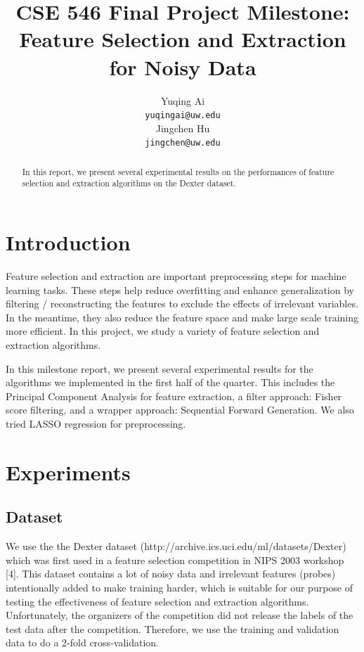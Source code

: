 \documentclass{article} %
\title{CSE 546 Final Project Milestone:\\
	Feature Selection and Extraction for Noisy Data}
\author{
	Yuqing Ai \\
	\texttt{yuqingai@uw.edu} \\
	\And
	Jingchen Hu \\
	\texttt{jingchen@uw.edu} \\
}
\begin{document}
	
	
	\maketitle
	
	\begin{abstract}
		In this report, we present several experimental results on the performances of feature selection and extraction algorithms on the Dexter dataset.
	\end{abstract}
	
	\section{Introduction}
	Feature selection and extraction are important preprocessing steps for machine learning tasks. These steps help reduce overfitting and enhance generalization by filtering / reconstructing the features to exclude the effects of irrelevant variables. In the meantime, they also reduce the feature space and make large scale training more efficient. In this project, we study a variety of feature selection and extraction algorithms.
	
	In this milestone report, we present several experimental results for the algorithms we implemented in the first half of the quarter. This includes the Principal Component Analysis for feature extraction, a filter approach: Fisher score filtering, and a wrapper approach: Sequential Forward Generation. We also tried LASSO regression for preprocessing.
	
	\section{Experiments}
	\subsection{Dataset}
	We use the the Dexter dataset (http://archive.ics.uci.edu/ml/datasets/Dexter) which was first used in a feature selection competition in NIPS 2003 workshop [4]. This dataset contains a lot of noisy data and irrelevant features (probes) intentionally added to make training harder, which is suitable for our purpose of testing the effectiveness of feature selection and extraction algorithms. Unfortunately, the organizers of the competition did not release the labels of the test data after the competition. Therefore, we use the training and validation data to do a 2-fold cross-validation.
	
\end{document}
